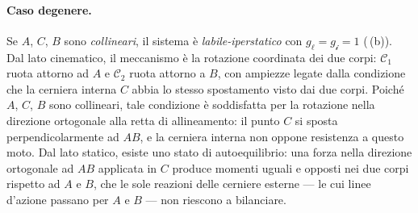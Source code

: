 \paragraph{Caso degenere.}
Se $A$, $C$, $B$ sono \emph{collineari}, il sistema è
\textit{labile-iperstatico} con $g_\ell = g_{\mathscr{i}} = 1$
(\,(b)).
Dal lato cinematico, il meccanismo è la rotazione coordinata
dei due corpi: $\mathcal{C}_1$ ruota attorno ad $A$ e
$\mathcal{C}_2$ ruota attorno a $B$, con ampiezze legate
dalla condizione che la cerniera interna $C$ abbia lo stesso
spostamento visto dai due corpi. Poiché $A$, $C$, $B$ sono
collineari, tale condizione è soddisfatta per la rotazione
nella direzione ortogonale alla retta di allineamento: il
punto $C$ si sposta perpendicolarmente ad $AB$, e la cerniera
interna non oppone resistenza a questo moto. Dal lato statico,
esiste uno stato di autoequilibrio: una forza nella direzione
ortogonale ad $AB$ applicata in $C$ produce momenti uguali e
opposti nei due corpi rispetto ad $A$ e $B$, che le sole
reazioni delle cerniere esterne --- le cui linee d'azione
passano per $A$ e $B$ --- non riescono a bilanciare.









